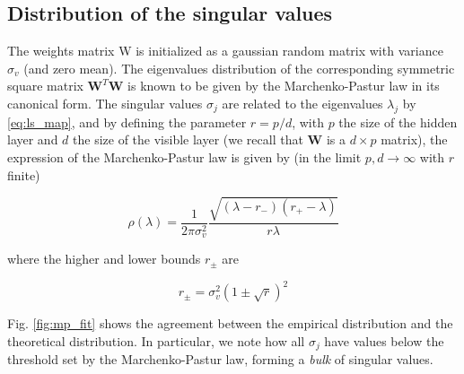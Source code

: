 \documentclass{revtex4-1}
\begin{document}
\subsection{Distribution of the singular values}
The weights matrix W is initialized as a gaussian random matrix with variance \(\sigma_v\) (and zero mean). The eigenvalues distribution of the corresponding symmetric square matrix \(\mathbf{W}^T \mathbf{W} \) is known to be given by the Marchenko-Pastur law \cite{MP_law} in its canonical form. The singular values \(\sigma_j\) are related to the eigenvalues \(\lambda_j\) by \eqref{eq:ls_map}, and by defining the parameter \( r = p/d \), with \(p\) the size of the hidden layer and \(d\) the size of the visible layer (we recall that \(\mathbf{W}\) is a \(d \times p\) matrix), the expression of the Marchenko-Pastur law is given by (in the limit \( p,d \to \infty \) with \(r\) finite)

\begin{equation}
\rho (\lambda) = \frac{1}{2 \pi \sigma_v^2} \frac{\sqrt{(\lambda - r_-)(r_+ - \lambda)}}{r \lambda}
\end{equation}

where the higher and lower bounds \(r_{\pm}\) are

\begin{equation}
r_{\pm} = \sigma_v^2 \left(1 \pm \sqrt{r} \right)^2
\end{equation}

Fig. \ref{fig:mp_fit} shows the agreement between the empirical distribution and the theoretical distribution. In particular, we note how all \(\sigma_j\) have values below the threshold set by the Marchenko-Pastur law, forming a \textit{bulk} of singular values.
\end{document}
